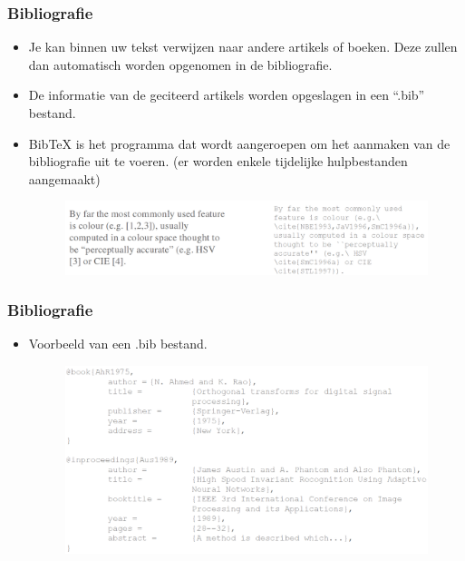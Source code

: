 \documentclass{beamer}
\begin{document}

\begin{frame}
\frametitle{Bibliografie}
\begin{itemize}
 \item Je kan binnen uw tekst verwijzen naar andere artikels of boeken. Deze zullen dan automatisch worden opgenomen in de bibliografie.
 \item De informatie van de geciteerd artikels worden opgeslagen in een ``.bib'' bestand.
 \item BibTeX is het programma dat wordt aangeroepen om het aanmaken van de bibliografie uit te voeren. (er worden enkele tijdelijke hulpbestanden aangemaakt)
  \begin{figure}[h] 
    \includegraphics[width=1\textwidth]{images/biblio.png}
  \end{figure}
 \end{itemize}
\end{frame}


\begin{frame}
\frametitle{Bibliografie}
\begin{itemize}
 \item Voorbeeld van een .bib bestand.
  \begin{figure}[h] 
    \includegraphics[width=1\textwidth]{images/bibliofile.png}
  \end{figure}
 \end{itemize}
\end{frame}
\end{document}
